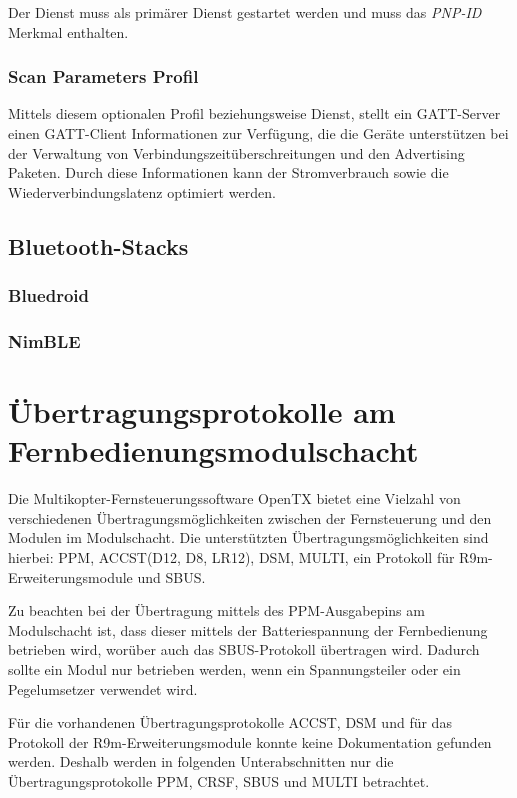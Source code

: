 Der Dienst muss als primärer Dienst gestartet werden und muss das \textit{PNP-ID} Merkmal enthalten. \cite[S.~14f.]{bluetoothHOGP}

\subsubsection{Scan Parameters Profil}
Mittels diesem optionalen Profil beziehungsweise Dienst, stellt ein \acs{GATT}-Server einen \acs{GATT}-Client Informationen zur Verfügung, die die Geräte unterstützen bei der Verwaltung von Verbindungszeitüberschreitungen und den Advertising Paketen. Durch diese Informationen kann der Stromverbrauch sowie die Wiederverbindungslatenz optimiert werden. \cite[S.~6]{bluetoothScan}

\subsection{Bluetooth-Stacks}
\subsubsection{Bluedroid}
\subsubsection{NimBLE}

\section{Übertragungsprotokolle am Fernbedienungsmodulschacht}

Die Multikopter-Fernsteuerungssoftware OpenTX bietet eine Vielzahl von verschiedenen Übertragungsmöglichkeiten zwischen der Fernsteuerung und den Modulen im Modulschacht. Die unterstützten Übertragungsmöglichkeiten sind hierbei: \ac{PPM}, ACCST(D12, D8, LR12)\cite{liangRCProtocols}, DSM, MULTI, ein Protokoll für R9m-Erweiterungsmodule \cite{frskyr9m} und SBUS. \cite{opentxsetup}

Zu beachten bei der Übertragung mittels des PPM-Ausgabepins am Modulschacht ist, dass dieser mittels der Batteriespannung der Fernbedienung betrieben wird, worüber auch das SBUS-Protokoll übertragen wird. Dadurch sollte ein Modul nur betrieben werden, wenn ein Spannungsteiler oder ein Pegelumsetzer verwendet wird. \cite{opentxFAQ}

Für die vorhandenen Übertragungsprotokolle ACCST, DSM und für das Protokoll der R9m-Erweiterungsmodule konnte keine Dokumentation gefunden werden. Deshalb werden in folgenden Unterabschnitten nur die Übertragungsprotokolle \ac{PPM}, CRSF, SBUS und MULTI betrachtet.

